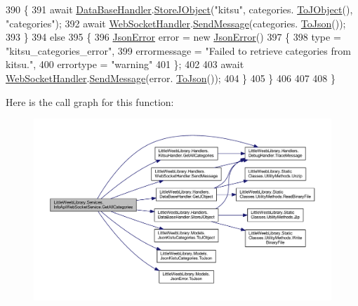 \begin{DoxyCode}
390                 \{
391                     await \mbox{\hyperlink{class_little_weeb_library_1_1_handlers_1_1_data_base_handler}{DataBaseHandler}}.\mbox{\hyperlink{class_little_weeb_library_1_1_handlers_1_1_data_base_handler_a5e6a70ef81b049da46b6ae3a15b09cd3}{StoreJObject}}(\textcolor{stringliteral}{"kitsu"}, categories.
      \mbox{\hyperlink{class_little_weeb_library_1_1_models_1_1_json_kistu_categories_aa4fa8f73a8a500c0ee4238329c2dd8f8}{ToJObject}}(), \textcolor{stringliteral}{"categories"});
392                     await \mbox{\hyperlink{class_little_weeb_library_1_1_handlers_1_1_web_socket_handler}{WebSocketHandler}}.\mbox{\hyperlink{class_little_weeb_library_1_1_handlers_1_1_web_socket_handler_a1de289d54d665a32c93478c68d3e6ad0}{SendMessage}}(categories.
      \mbox{\hyperlink{class_little_weeb_library_1_1_models_1_1_json_kistu_categories_aaab94c1dc228770f7bf0b66f4a47fd54}{ToJson}}());
393                 \}
394                 \textcolor{keywordflow}{else}
395                 \{
396                     \mbox{\hyperlink{class_little_weeb_library_1_1_models_1_1_json_error}{JsonError}} error = \textcolor{keyword}{new} \mbox{\hyperlink{class_little_weeb_library_1_1_models_1_1_json_error}{JsonError}}()
397                     \{
398                         type = \textcolor{stringliteral}{"kitsu\_categories\_error"},
399                         errormessage = \textcolor{stringliteral}{"Failed to retrieve categories from kitsu."},
400                         errortype = \textcolor{stringliteral}{"warning"}
401                     \};
402 
403                     await \mbox{\hyperlink{class_little_weeb_library_1_1_handlers_1_1_web_socket_handler}{WebSocketHandler}}.\mbox{\hyperlink{class_little_weeb_library_1_1_handlers_1_1_web_socket_handler_a1de289d54d665a32c93478c68d3e6ad0}{SendMessage}}(error.
      \mbox{\hyperlink{class_little_weeb_library_1_1_models_1_1_json_error_a0e3e7dd2e2990404b7f0461742b23440}{ToJson}}());
404                 \}
405             \}
406                 
407 
408         \}
\end{DoxyCode}
Here is the call graph for this function\+:\nopagebreak
\begin{figure}[H]
\begin{center}
\leavevmode
\includegraphics[width=350pt]{class_little_weeb_library_1_1_services_1_1_info_api_web_socket_service_a310f91aba5d17d8202aea81442da2545_cgraph}
\end{center}
\end{figure}
